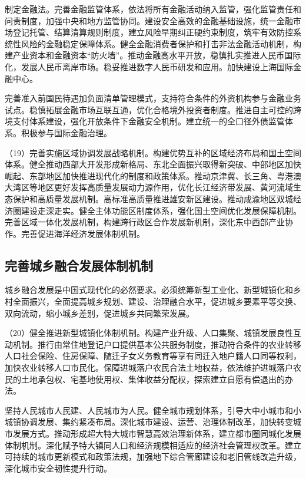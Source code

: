     制定金融法。完善金融监管体系，依法将所有金融活动纳入监管，强化监管责任和问责制度，加强中央和地方监管协同。建设安全高效的金融基础设施，统一金融市场登记托管、结算清算规则制度，建立风险早期纠正硬约束制度，筑牢有效防控系统性风险的金融稳定保障体系。健全金融消费者保护和打击非法金融活动机制，构建产业资本和金融资本“防火墙”。推动金融高水平开放，稳慎扎实推进人民币国际化，发展人民币离岸市场。稳妥推进数字人民币研发和应用。加快建设上海国际金融中心。

    完善准入前国民待遇加负面清单管理模式，支持符合条件的外资机构参与金融业务试点。稳慎拓展金融市场互联互通，优化合格境外投资者制度。推进自主可控的跨境支付体系建设，强化开放条件下金融安全机制。建立统一的全口径外债监管体系。积极参与国际金融治理。

    （19）完善实施区域协调发展战略机制。构建优势互补的区域经济布局和国土空间体系。健全推动西部大开发形成新格局、东北全面振兴取得新突破、中部地区加快崛起、东部地区加快推进现代化的制度和政策体系。推动京津冀、长三角、粤港澳大湾区等地区更好发挥高质量发展动力源作用，优化长江经济带发展、黄河流域生态保护和高质量发展机制。高标准高质量推进雄安新区建设。推动成渝地区双城经济圈建设走深走实。健全主体功能区制度体系，强化国土空间优化发展保障机制。完善区域一体化发展机制，构建跨行政区合作发展新机制，深化东中西部产业协作。完善促进海洋经济发展体制机制。

    \subsection{完善城乡融合发展体制机制}

    城乡融合发展是中国式现代化的必然要求。必须统筹新型工业化、新型城镇化和乡村全面振兴，全面提高城乡规划、建设、治理融合水平，促进城乡要素平等交换、双向流动，缩小城乡差别，促进城乡共同繁荣发展。

    （20）健全推进新型城镇化体制机制。构建产业升级、人口集聚、城镇发展良性互动机制。推行由常住地登记户口提供基本公共服务制度，推动符合条件的农业转移人口社会保险、住房保障、随迁子女义务教育等享有同迁入地户籍人口同等权利，加快农业转移人口市民化。保障进城落户农民合法土地权益，依法维护进城落户农民的土地承包权、宅基地使用权、集体收益分配权，探索建立自愿有偿退出的办法。

    坚持人民城市人民建、人民城市为人民。健全城市规划体系，引导大中小城市和小城镇协调发展、集约紧凑布局。深化城市建设、运营、治理体制改革，加快转变城市发展方式。推动形成超大特大城市智慧高效治理新体系，建立都市圈同城化发展体制机制。深化赋予特大镇同人口和经济规模相适应的经济社会管理权改革。建立可持续的城市更新模式和政策法规，加强地下综合管廊建设和老旧管线改造升级，深化城市安全韧性提升行动。

